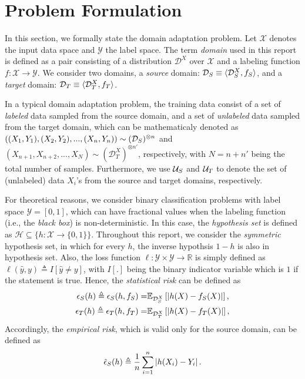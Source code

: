 \section{Problem Formulation}\label{sect:prob_form}
In this section, we formally state the domain adaptation problem. Let $\mathcal{X}$ denotes the input data space and $\mathcal{Y}$ the label space. The term \textit{domain} used in this report is defined as a pair consisting of a distribution $\mathcal{D}^X$ over $\mathcal{X}$ and a labeling function $f: \mathcal{X} \rightarrow \mathcal{Y}$. We consider two domains, a \textit{source} domain: $\mathcal{D}_S \equiv \langle \mathcal{D}^X_S, f_S \rangle$, and a \textit{target} domain: $\mathcal{D}_T \equiv \langle \mathcal{D}^X_T, f_T \rangle$.

In a typical domain adaptation problem, the training data consist of a set of \textit{labeled} data sampled from the source domain, and a set of \textit{unlabeled} data sampled from the target domain, which can be mathematicaly denoted as $((X_1,Y_1),(X_2,Y_2),...,(X_n,Y_n)) \sim (\mathcal{D}_S)^{\otimes n}$ and $(X_{n+1},X_{n+2},...,X_N) \sim (\mathcal{D}^X_T)^{\otimes n'}$, respectively, with $N=n+n'$ being the total number of samples. Furthermore, we use $\mathcal{U}_S$ and $\mathcal{U}_T$ to denote the set of (unlabeled) data $X_i$'s from the source and target domains, respectively.


For theoretical reasons, we consider binary classification problems with label space $\mathcal{Y}=[0, 1]$, which can have fractional values when the labeling function (i.e., the \textit{black box}) is non-deterministic. In this case, the \textit{hypothesis set} is defined as $\mathcal{H} \subseteq \{h:\mathcal{X} \rightarrow \{0,1\}\}$. Throughout this report, we consider the \textit{symmetric} hypothesis set, in which for every $h$, the inverse hypothsis $1-h$ is also in hypothesis set. Also, the loss function $\ell: \mathcal{Y} \times \mathcal{Y} \rightarrow \mathbb{R}$ is simply defined as $\ell (\hat{y},y) \triangleq I \left[ \hat{y} \neq y \right]$, with $I[.]$ being the binary indicator variable which is $1$ if the statement is true. Hence, the \textit{statistical risk} can be defined as
\begin{align}
\epsilon_{S}(h) \triangleq \epsilon_{S}(h, f_S) = & \mathbb{E}_{\mathcal{D}_S^X}\left[\left \lvert h(X) - f_S(X) \right \rvert\right], \label{eq:RiskS}\\
\epsilon_{T}(h) \triangleq \epsilon_{T}(h, f_T) = & \mathbb{E}_{\mathcal{D}_T^X}\left[\left \lvert h(X) - f_T(X) \right \rvert\right], \label{eq:RiskT}
\end{align}
Accordingly, the \textit{empirical risk}, which is valid only for the source domain, can be defined as
\begin{equation}\label{eq:ERiskS}
\hat{\epsilon}_{S}(h) \triangleq \frac{1}{n} \sum_{i=1}^{n} \left \lvert h(X_i) - Y_i \right \rvert.
\end{equation}

